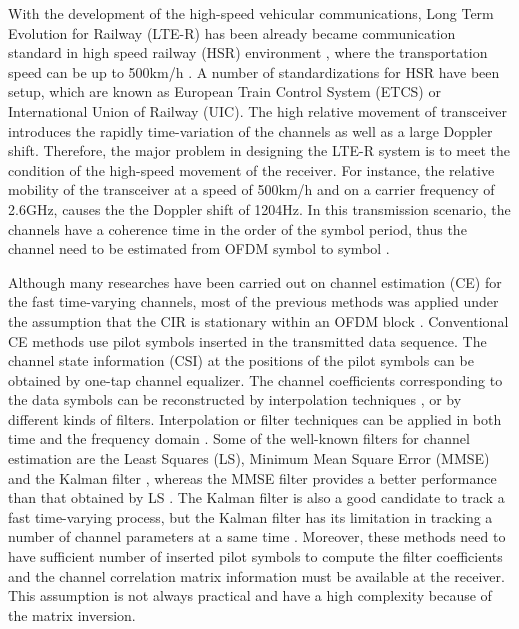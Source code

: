 \documentclass[12pt,journal,draftclsnofoot,onecolumn]{IEEEtran}
\begin{document}
With the development of the high-speed vehicular communications, Long Term Evolution for Railway (LTE-R) has been already became communication standard in high speed railway (HSR) environment \cite{Luo2012,Fokum2010}, where the transportation speed can be up to 500km/h \cite{Banerjee2016}. A number of standardizations for HSR have been setup, which are known as European Train Control System (ETCS) or International Union of Railway (UIC). The high relative movement of transceiver introduces the  rapidly time-variation of the channels as well as a large Doppler shift. Therefore, the major problem in designing the LTE-R system is to meet the condition of the high-speed movement of the receiver. For instance, the relative mobility of the transceiver at a speed of 500km/h and on a carrier frequency of 2.6GHz, causes the the Doppler shift of 1204Hz. In this transmission scenario, the channels have a coherence time in the order of the symbol period,  thus the channel need to be estimated from OFDM symbol to symbol \cite{Barhumi2005}.

Although many researches have been carried out on channel estimation (CE) for the fast time-varying channels, most of the previous methods was applied under the assumption that the CIR is stationary within an OFDM block \cite {Hu2003, Tang2007, Park2005}. Conventional CE methods use pilot symbols inserted in the transmitted data sequence. The channel state information (CSI) at the positions of the pilot symbols can be obtained by one-tap channel equalizer. The channel coefficients corresponding to the data symbols can be reconstructed by interpolation techniques \cite{Cavers1991, Lau1994}, or by different kinds of filters. Interpolation or filter techniques can be applied in both time and the frequency domain \cite{Mostofi2005,Hijazi2009,Simko2011}. Some of the well-known filters for channel estimation are the  Least Squares (LS), Minimum Mean Square Error (MMSE)  \cite{Mostofi2005,Hijazi2009,Simko2011} and the Kalman filter \cite{Kaufman1983}, whereas the MMSE filter provides a better performance than that obtained by LS \cite{Edfors1998}. The Kalman filter is also a good candidate to track a fast time-varying process, but the Kalman filter has its limitation in tracking a number of channel parameters at a same time \cite{Kaufman1983}. Moreover, these methods need to have sufficient number of inserted pilot symbols to compute the filter coefficients and the channel correlation matrix information must be available at the receiver. This assumption is not always practical and have a high complexity because of the matrix inversion. 
\end{document}
